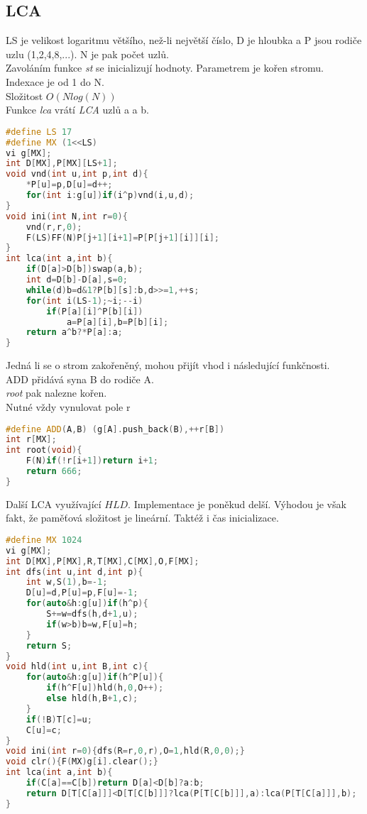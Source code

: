 \documentclass[11pt]{article}
\begin{document}
\subsection{LCA}
\textsf{LS} je velikost logaritmu většího, než-li největší číslo, \textsf{D} je hloubka a \textsf{P} jsou rodiče uzlu (1,2,4,8,...). \textsf{N} je pak počet uzlů.
\\Zavoláním funkce \textit{st} se inicializují hodnoty. Parametrem je kořen stromu.
\\Indexace je od 1 do \textsf{N}.
\\Složitost $O(Nlog(N))$
\\Funkce \textit{lca} vrátí \textit{LCA} uzlů \textsf{a} a \textsf{b}.
\begin{lstlisting}[language=C++]
#define LS 17
#define MX (1<<LS)
vi g[MX];
int D[MX],P[MX][LS+1];
void vnd(int u,int p,int d){
    *P[u]=p,D[u]=d++;
    for(int i:g[u])if(i^p)vnd(i,u,d);
}
void ini(int N,int r=0){
    vnd(r,r,0);
    F(LS)FF(N)P[j+1][i+1]=P[P[j+1][i]][i];
}
int lca(int a,int b){
    if(D[a]>D[b])swap(a,b);
    int d=D[b]-D[a],s=0;
    while(d)b=d&1?P[b][s]:b,d>>=1,++s;
    for(int i(LS-1);~i;--i)
        if(P[a][i]^P[b][i])
            a=P[a][i],b=P[b][i];
    return a^b?*P[a]:a;
}
\end{lstlisting}
Jedná li se o strom zakořeněný, mohou přijít vhod i následující funkčnosti.
\\ADD přidává syna \textsf{B} do rodiče \textsf{A}.
\\\textit{root} pak nalezne kořen.
\\Nutné vždy vynulovat pole \textsf{r}
\begin{lstlisting}[language=C++]
#define ADD(A,B) (g[A].push_back(B),++r[B])
int r[MX];
int root(void){
    F(N)if(!r[i+1])return i+1;
    return 666;
}
\end{lstlisting}
Další LCA využívající $HLD$. Implementace je poněkud delší. Výhodou je však fakt, že paměťová složitost je lineární. Taktéž i čas inicializace.
\begin{lstlisting}[language=C++]
#define MX 1024
vi g[MX];
int D[MX],P[MX],R,T[MX],C[MX],O,F[MX];
int dfs(int u,int d,int p){
    int w,S(1),b=-1;
    D[u]=d,P[u]=p,F[u]=-1;
    for(auto&h:g[u])if(h^p){
        S+=w=dfs(h,d+1,u);
        if(w>b)b=w,F[u]=h;
    }
    return S;
}
void hld(int u,int B,int c){
    for(auto&h:g[u])if(h^P[u]){
        if(h^F[u])hld(h,0,O++);
        else hld(h,B+1,c);
    }
    if(!B)T[c]=u;
    C[u]=c;
}
void ini(int r=0){dfs(R=r,0,r),O=1,hld(R,0,0);}
void clr(){F(MX)g[i].clear();}
int lca(int a,int b){
    if(C[a]==C[b])return D[a]<D[b]?a:b;
    return D[T[C[a]]]<D[T[C[b]]]?lca(P[T[C[b]]],a):lca(P[T[C[a]]],b);
}
\end{lstlisting}
\end{document}
